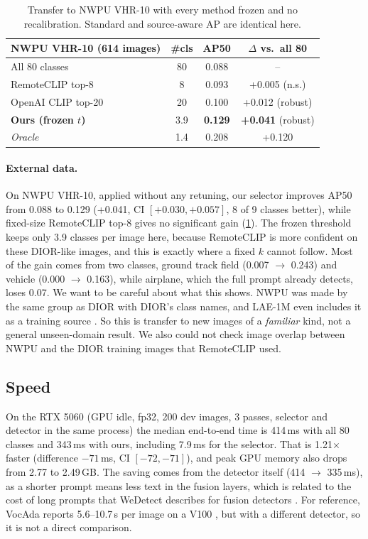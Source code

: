 \begin{table}[t]
  \centering
  \small
  \setlength{\tabcolsep}{4pt}
  \begin{tabular}{@{}lccc@{}}
    \toprule
    NWPU VHR-10 (614 images) & \#cls & AP50 & $\Delta$ vs.\ all 80 \\
    \midrule
    All 80 classes & 80 & 0.088 & -- \\
    RemoteCLIP top-8 & 8 & 0.093 & +0.005 (n.s.) \\
    OpenAI CLIP top-20 & 20 & 0.100 & +0.012 (robust) \\
    \textbf{Ours (frozen $t$)} & 3.9 & \textbf{0.129} & \textbf{+0.041} (robust) \\
    \midrule
    \textit{Oracle} & 1.4 & 0.208 & +0.120 \\
    \bottomrule
  \end{tabular}
  \caption{Transfer to NWPU VHR-10 with every method frozen and no recalibration. Standard and source-aware AP are identical here.}
  \label{tab:nwpu}
\end{table}

\paragraph{External data.}
On NWPU VHR-10, applied without any retuning, our selector improves AP50 from 0.088 to 0.129 (+0.041, CI $[+0.030, +0.057]$, 8 of 9 classes better), while fixed-size RemoteCLIP top-8 gives no significant gain (\cref{tab:nwpu}).
The frozen threshold keeps only 3.9 classes per image here, because RemoteCLIP is more confident on these DIOR-like images, and this is exactly where a fixed $k$ cannot follow.
Most of the gain comes from two classes, ground track field (0.007 $\rightarrow$ 0.243) and vehicle (0.000 $\rightarrow$ 0.163), while airplane, which the full prompt already detects, loses 0.07.
We want to be careful about what this shows.
NWPU was made by the same group as DIOR with DIOR's class names, and LAE-1M even includes it as a training source \cite{pan2025lae}.
So this is transfer to new images of a \emph{familiar} kind, not a general unseen-domain result.
We also could not check image overlap between NWPU and the DIOR training images that RemoteCLIP used.

\subsection{Speed}
On the RTX 5060 (GPU idle, fp32, 200 dev images, 3 passes, selector and detector in the same process) the median end-to-end time is 414\,ms with all 80 classes and 343\,ms with ours, including 7.9\,ms for the selector.
That is 1.21$\times$ faster (difference $-71$\,ms, CI $[-72, -71]$), and peak GPU memory also drops from 2.77 to 2.49\,GB.
The saving comes from the detector itself (414 $\rightarrow$ 335\,ms), as a shorter prompt means less text in the fusion layers, which is related to the cost of long prompts that WeDetect describes for fusion detectors \cite{fu2026wedetect}.
For reference, VocAda reports 5.6--10.7\,s per image on a V100 \cite{liu2025vocada}, but with a different detector, so it is not a direct comparison.

